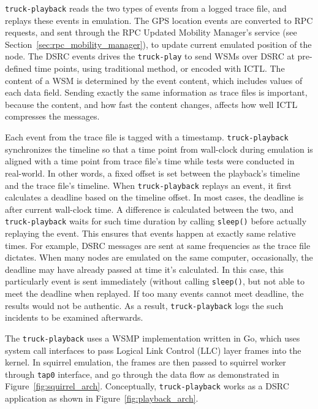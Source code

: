 \documentclass[12pt]{report}
\begin{document}
\texttt{truck-playback} reads the two types of events from a logged trace file, and replays these events in emulation. The GPS location events are converted to RPC requests, and sent through the RPC Updated Mobility Manager's service (see Section~\ref{sec:rpc_mobility_manager}), to update current emulated position of the node. The DSRC events drives the \texttt{truck-play} to send WSMs over DSRC at pre-defined time points, using traditional method, or encoded with ICTL. The content of a WSM is determined by the event content, which includes values of each data field. Sending exactly the same information as trace files is important, because the content, and how fast the content changes, affects how well ICTL compresses the messages.

Each event from the trace file is tagged with a timestamp. \texttt{truck-playback} synchronizes the timeline so that a time point from wall-clock during emulation is aligned with a time point from trace file's time while tests were conducted in real-world. In other words, a fixed offset is set between the playback's timeline and the trace file's timeline. When \texttt{truck-playback} replays an event, it first calculates a deadline based on the timeline offset. In most cases, the deadline is after current wall-clock time. A difference is calculated between the two, and \texttt{truck-playback} waits for such time duration by calling \texttt{sleep()} before actually replaying the event. This ensures that events happen at exactly same relative times. For example, DSRC messages are sent at same frequencies as the trace file dictates. When many nodes are emulated on the same computer, occasionally, the deadline may have already passed at time it's calculated. In this case, this particularly event is sent immediately (without calling \texttt{sleep()}, but not able to meet the deadline when replayed. If too many events cannot meet deadline, the results would not be authentic. As a result, \texttt{truck-playback} logs the such incidents to be examined afterwards.

The \texttt{truck-playback} uses a WSMP implementation written in Go, which uses system call interfaces to pass Logical Link Control (LLC) layer frames into the kernel. In squirrel emulation, the frames are then passed to squirrel worker through \texttt{tap0} interface, and go through the data flow as demonstrated in Figure~\ref{fig:squirrel_arch}. Conceptually, \texttt{truck-playback} works as a DSRC application as shown in Figure~\ref{fig:playback_arch}.
\end{document}
